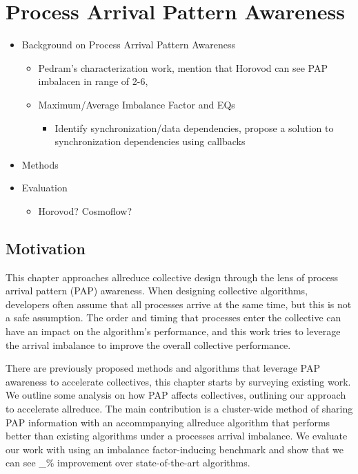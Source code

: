 
\glsresetall %
\chapter[PAPAwareness]{Process Arrival Pattern Awareness}\label{ch:PAPAwareness}

\begin{itemize}
    \item Background on Process Arrival Pattern Awareness
    \begin{itemize}
        \item Pedram's characterization work, mention that Horovod can see PAP imbalacen in range of 2-6, \cite{Alizadeh2022PAPCollDL, Mohammadalizadehbakhtevari2021Thesis}
        \item Maximum/Average Imbalance Factor and EQs
        \begin{itemize}
            \item Identify synchronization/data dependencies, propose a solution to synchronization dependencies using callbacks \cite{Luo2018ADAPT}
        \end{itemize}
    \end{itemize}
    \item Methods
    \item Evaluation
    \begin{itemize}
        \item Horovod? Cosmoflow?
    \end{itemize}
\end{itemize}

\section{Motivation}

This chapter approaches allreduce collective design through the lens of process arrival pattern (PAP) awareness. 
When designing collective algorithms, developers often assume that all processes arrive at the same time, but this is not a safe assumption.
The order and timing that processes enter the collective can have an impact on the algorithm's performance, and this work tries to leverage the arrival imbalance to improve the overall collective performance.

There are previously proposed methods and algorithms that leverage PAP awareness to accelerate collectives, this chapter starts by surveying existing work.
We outline some analysis on how PAP affects collectives, outlining our approach to accelerate allreduce.
The main contribution is a cluster-wide method of sharing PAP information with an accommpanying allreduce algorithm that performs better than existing algorithms under a processes arrival imbalance.
We evaluate our work with using an imbalance factor-inducing benchmark and show that we can see \_\% improvement over state-of-the-art algorithms.  

